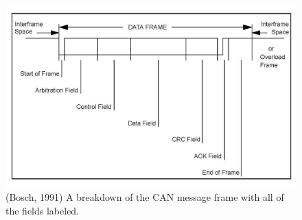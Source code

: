 \documentclass[12pt]{article}
\begin{document}
 \begin{figure}[!h]
    \centering
    \includegraphics[width=\textwidth]{images/02-2023/CAN Specification_Page_11.jpg}
    \caption{(Bosch, 1991) A breakdown of the CAN message frame with all of the fields labeled.}
    \label{fig:can_specification}
\end{figure}
\pagebreak
\end{document}
